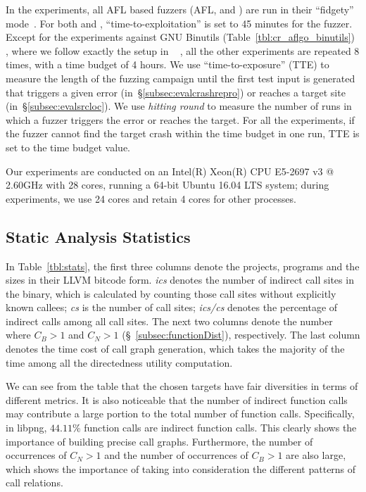 In the experiments, all AFL based fuzzers (AFL, {\aflgo} and {\dGO}) are run in their ``fidgety'' mode~\cite{FidgetyAFL}. For both {\aflgo} and {\dGO}, ``time-to-exploitation'' is set to 45 minutes for the fuzzer. Except for the experiments against GNU Binutils (Table~\ref{tbl:cr_aflgo_binutils}) , where we follow exactly the setup in {\aflgo}~\cite{Bohme:2017:DGF} , all the other experiments are repeated 8 times, with a time budget of 4 hours. 
We use ``time-to-exposure'' (TTE) to measure the length of the
fuzzing campaign until the first test input is generated that triggers a given error (in~\S\ref{subsec:evalcrashrepro}) or reaches a target site (in~\S\ref{subsec:evalsrcloc}).
We use \emph{hitting round} to measure the number of runs in which a fuzzer triggers the error or reaches the target.
For all the experiments, if the fuzzer cannot find the target crash within the time budget in one run, TTE is set to the time budget value. 

Our experiments are conducted on an Intel(R) Xeon(R) CPU E5-2697 v3 @ 2.60GHz with 28 cores, running a 64-bit Ubuntu 16.04 LTS system; during experiments, we use 24 cores and retain 4 cores for other processes. 


\subsection{Static Analysis Statistics}\label{subsec:evalstatic}


In Table~\ref{tbl:stats}, the first three columns denote the projects, programs and the sizes in their LLVM bitcode form. \emph{ics} denotes the number of indirect call sites in the binary, which is calculated by counting those call sites without explicitly known callees; \emph{cs} is the number of call sites; \emph{ics/cs} denotes the percentage of indirect calls among all call sites. 
The next two columns denote the number where $C_B>1$ and $C_N>1$ (\S~\ref{subsec:functionDist}), respectively. The last column denotes the time cost of call graph generation, which takes the majority of the time among all the directedness utility computation.



We can see from  the table that the chosen targets have fair diversities in terms of different metrics.
It is also noticeable that the number of indirect function calls may contribute a large portion to the total number of function calls.
Specifically, in libpng, $44.11\%$ function calls are indirect function calls.
This clearly shows the importance of building precise call graphs.
Furthermore, the number of occurrences of $C_N>1$ and the number of occurrences of $C_B>1$ are also large, which shows the importance of taking into consideration the different patterns of call relations.




